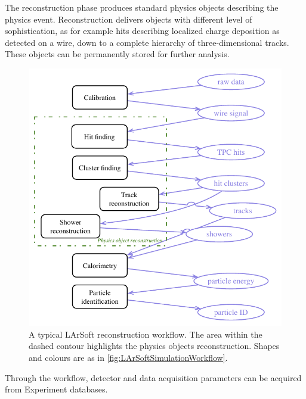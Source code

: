 The reconstruction phase produces standard physics objects describing the physics event.
Reconstruction delivers objects with different level of sophistication,
as for example hits describing localized charge deposition as detected on a wire,
down to a complete hierarchy of three-dimensional tracks.
These objects can be permanently stored for further analysis.
\begin{figure}
   \centering
   \includegraphics{figures/LArSoftReconstructionWorkflow}
   \caption[Typical LArSoft reconstruction workflow]{
      \label{fig:LArSoftReconstructionWorkflow}
      A typical LArSoft reconstruction workflow.
      The area within the dashed contour highlights the physics objects reconstruction.
      Shapes and colours are as in \cref{fig:LArSoftSimulationWorkflow}.
   }
\end{figure}
Through the workflow, detector and data acquisition parameters
can be acquired from Experiment databases.

